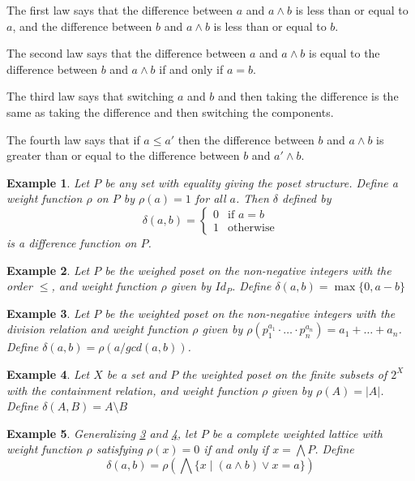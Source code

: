 \documentclass[acmsmall,review,anonymous]{acmart}\settopmatter{printfolios=true,printccs=false,printacmref=false}
\newtheorem{example}{Example}
\begin{document}
The first law says that the difference between $a$ and $a \wedge b$ is less
than or equal to $a$, and the difference between $b$ and $a \wedge b$
is less than or equal to $b$.

The second law says that the difference between $a$ and $a \wedge b$ is equal
to the difference between $b$ and $a \wedge b$ if and only if $a = b$.

The third law says that switching $a$ and $b$ and then taking the difference
is the same as taking the difference and then switching the components.

The fourth law says that if $a \leq a'$ then the difference between $b$
and $a \wedge b$ is greater than or equal to the difference between $b$ and $a'
\wedge b$.
\fi
\begin{example}\label{embedding}
Let $P$ be any set with equality giving the poset structure. Define
a weight function $\rho$ on $P$ by $\rho(a) = 1$ for all $a$. Then $\delta$
defined by $$ \delta(a, b) =
\begin{cases}
0 & \text{if } a = b\\
1 & \text{otherwise}
\end{cases}
$$
is a difference function on $P$.
\end{example}
\begin{example}\label{naturalnumbers}
Let $P$ be the weighed poset on the non-negative integers with the order $\leq$,
and weight function $\rho$ given by $Id_P$. Define $\delta(a, b) = \max\{0,
a-b\}$
\end{example}
\begin{example}\label{divisibility}
Let $P$ be the weighted poset on the non-negative integers with the division
relation and weight function $\rho$ given by $\rho(p_1^{a_1} \cdot \ldots \cdot
p_n^{a_n}) = a_1 + \ldots + a_n$. Define $\delta(a, b) = \rho(a/gcd(a, b))$.
\end{example}
\begin{example}\label{boolean}
Let $X$ be a set and $P$ the weighted poset on the finite subsets of $2^X$ with
the containment relation, and weight function $\rho$ given by $\rho(A) = |A|$.
Define $\delta(A, B) = A \setminus B$
\end{example}
\begin{example}\label{general}
Generalizing \cref{divisibility} and
\cref{boolean}, let $P$ be a complete weighted lattice with weight function
$\rho$ satisfying $\rho(x) = 0$ if and only if $x = \bigwedge P$. Define
$$\delta(a, b) = \rho\left(\bigwedge \{x \; | \; (a \wedge b) \vee x =
a\}\right)$$
\end{example}
\end{document}
